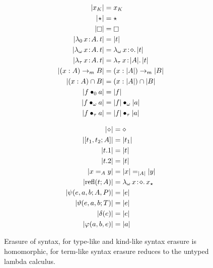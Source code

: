 

\begin{figure}
    \centering
    \begin{minipage}{0.5\textwidth}
        \begin{align*}
            |x_K| &= x_K \\
            |\!\star\!| &= \star \\
            |\kind| &= \kind \\
            |\abs{\lambda_0}{x}{A}{t}| &= |t| \\
            |\abs{\lambda_\omega}{x}{A}{t}| &= \abs{\lambda_\omega}{x}{\diamond}{|t|} \\
            |\abs{\lambda_\tau}{x}{A}{t}| &= \abs{\lambda_\tau}{x}{|A|}{|t|} \\
            |(x:A) \to_m B| &= (x:|A|) \to_m |B| \\
            |(x:A) \cap B| &= (x:|A|) \cap |B| \\
            |\app{f}{0}{a}| &= |f| \\
            |\app{f}{\omega}{a}| &= \app{|f|}{\omega}{|a|} \\
            |\app{f}{\tau}{a}| &= \app{|f|}{\tau}{|a|}
        \end{align*}
    \end{minipage}%
    \begin{minipage}{0.5\textwidth}
        \begin{align*}
            |\!\diamond\!| &= \diamond \\
            |[t_1, t_2; A]| &= |t_1| \\
            |t.1| &= |t| \\
            |t.2| &= |t| \\
            |x =_A y| &= |x| =_{|A|} |y| \\
            |\text{refl}(t; A)| &= {\lambda_\omega}\, x\! : \! \diamond.\, x_\star \\
            |\psi(e, a, b; A, P)| &= |e| \\
            |\vartheta(e, a, b; T)| &= |e| \\
            |\delta(e)| &= |e| \\
            |\varphi(a, b, e)| &= |a|
        \end{align*}
    \end{minipage}
    \caption{Erasure of syntax, for type-like and kind-like syntax erasure is homomorphic, for term-like syntax erasure reduces to the untyped lambda calculus.}
    \label{fig:2:erasure}
\end{figure}

